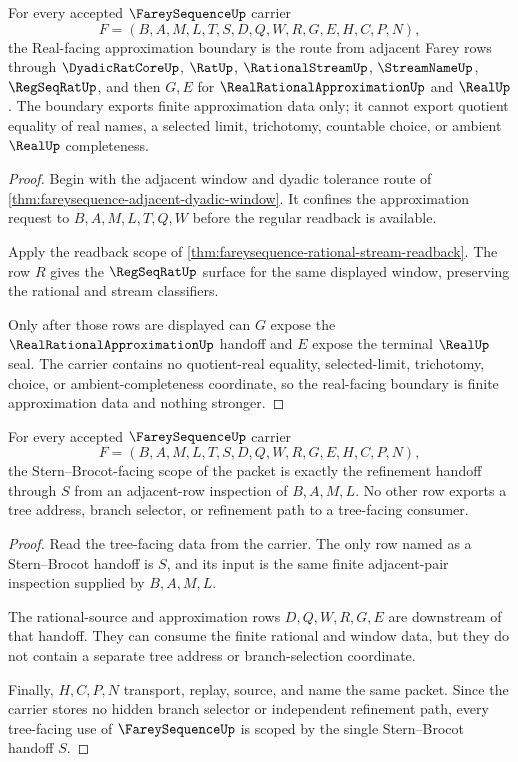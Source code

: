 \begin{theorem}
\label{thm:fareysequence-real-approximation-boundary}
For every accepted $\FareySequenceUp$ carrier
$$
F=(B,A,M,L,T,S,D,Q,W,R,G,E,H,C,P,N),
$$
the Real-facing approximation boundary is the route from adjacent Farey rows through $\DyadicRatCoreUp$, $\RatUp$, $\RationalStreamUp$, $\StreamNameUp$, $\RegSeqRatUp$, and then $G,E$ for $\RealRationalApproximationUp$ and $\RealUp$. The boundary exports finite approximation data only; it cannot export quotient equality of real names, a selected limit, trichotomy, countable choice, or ambient $\RealUp$ completeness.
\end{theorem}
\begin{proof}
Begin with the adjacent window and dyadic tolerance route of \autoref{thm:fareysequence-adjacent-dyadic-window}. It confines the approximation request to $B,A,M,L,T,Q,W$ before the regular readback is available.

Apply the readback scope of \autoref{thm:fareysequence-rational-stream-readback}. The row $R$ gives the $\RegSeqRatUp$ surface for the same displayed window, preserving the rational and stream classifiers.

Only after those rows are displayed can $G$ expose the $\RealRationalApproximationUp$ handoff and $E$ expose the terminal $\RealUp$ seal. The carrier contains no quotient-real equality, selected-limit, trichotomy, choice, or ambient-completeness coordinate, so the real-facing boundary is finite approximation data and nothing stronger.
\end{proof}

\begin{theorem}
\label{thm:farey-sequence-stern-brocot-refinement-scope}
For every accepted $\FareySequenceUp$ carrier
$$
F=(B,A,M,L,T,S,D,Q,W,R,G,E,H,C,P,N),
$$
the Stern--Brocot-facing scope of the packet is exactly the refinement handoff through $S$ from an adjacent-row inspection of $B,A,M,L$. No other row exports a tree address, branch selector, or refinement path to a tree-facing consumer.
\end{theorem}
\begin{proof}
Read the tree-facing data from the carrier. The only row named as a Stern--Brocot handoff is $S$, and its input is the same finite adjacent-pair inspection supplied by $B,A,M,L$.

The rational-source and approximation rows $D,Q,W,R,G,E$ are downstream of that handoff. They can consume the finite rational and window data, but they do not contain a separate tree address or branch-selection coordinate.

Finally, $H,C,P,N$ transport, replay, source, and name the same packet. Since the carrier stores no hidden branch selector or independent refinement path, every tree-facing use of $\FareySequenceUp$ is scoped by the single Stern--Brocot handoff $S$.
\end{proof}

